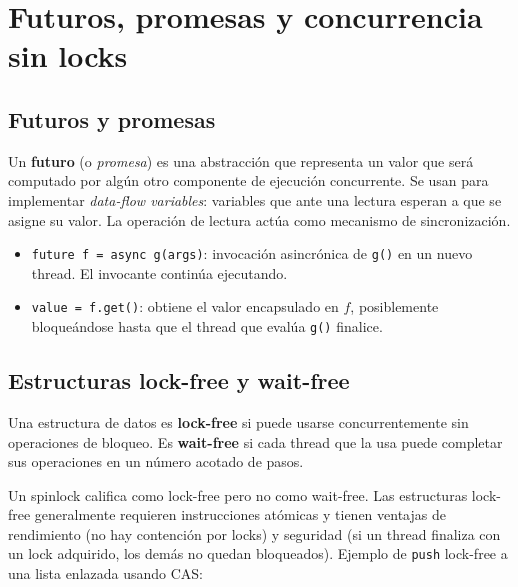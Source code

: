 \documentclass[11pt,a4paper]{article}
\begin{document}
\section{Futuros, promesas y concurrencia sin locks}

\subsection{Futuros y promesas}

\begin{definicion}
Un \textbf{futuro} (o \emph{promesa}) es una abstracción que
representa un valor que será computado por algún otro componente de
ejecución concurrente. Se usan para implementar \emph{data-flow
variables}: variables que ante una lectura esperan a que se asigne su
valor. La operación de lectura actúa como mecanismo de sincronización.
\end{definicion}

\begin{itemize}[leftmargin=*,nosep]
    \item \texttt{future f = async g(args)}: invocación asincrónica
        de \texttt{g()} en un nuevo thread. El invocante continúa
        ejecutando.
    \item \texttt{value = f.get()}: obtiene el valor encapsulado en
        $f$, posiblemente bloqueándose hasta que el thread que evalúa
        \texttt{g()} finalice.
\end{itemize}

\subsection{Estructuras lock-free y wait-free}

\begin{definicion}
Una estructura de datos es \textbf{lock-free} si puede usarse
concurrentemente sin operaciones de bloqueo. Es \textbf{wait-free} si
cada thread que la usa puede completar sus operaciones en un número
acotado de pasos.
\end{definicion}

Un spinlock califica como lock-free pero no como wait-free. Las
estructuras lock-free generalmente requieren instrucciones atómicas
y tienen ventajas de rendimiento (no hay contención por locks) y
seguridad (si un thread finaliza con un lock adquirido, los demás no
quedan bloqueados). Ejemplo de \texttt{push} lock-free a una lista
enlazada usando CAS:
\end{document}
